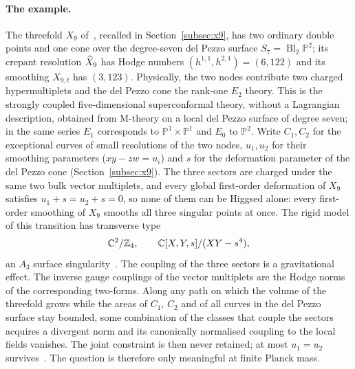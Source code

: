 \paragraph{The example.}
The threefold $X_9$ of~\cite{W26global,W26quantum}, recalled in Section~\ref{subsec:x9}, has
two ordinary double points and one cone over the degree-seven del Pezzo surface
$S_7=\operatorname{Bl}_2\mathbb P^2$; its crepant resolution $\widehat X_9$ has Hodge numbers
$(h^{1,1},h^{2,1})=(6,122)$ and its smoothing $X_{9,t}$ has $(3,123)$. Physically, the two nodes
contribute two charged hypermultiplets and the del Pezzo cone the rank-one $E_2$ theory. This is
the strongly coupled five-dimensional superconformal theory, without a Lagrangian description,
obtained from M-theory on a local del Pezzo surface of degree seven; in the same series $E_1$
corresponds to $\mathbb P^1\times\mathbb P^1$ and $E_0$ to $\mathbb P^2$. Write $C_1,C_2$ for the exceptional
curves of small resolutions of the two nodes, $u_1,u_2$ for their smoothing parameters
($xy-zw=u_i$) and $s$ for the deformation parameter of the del Pezzo cone
(Section~\ref{subsec:x9}). The three sectors are charged under the same two bulk vector multiplets,
and every global first-order deformation of $X_9$ satisfies $u_1+s=u_2+s=0$, so none of them can be Higgsed
alone: every first-order smoothing of $X_9$ smooths all three singular points at once. The rigid model of
this transition has transverse type
\begin{equation}
 \mathbb C^2/\mathbb Z_4,\qquad \mathbb C[X,Y,s]/(XY-s^4),
 \label{eq:intro-A3}
\end{equation}
an $A_3$ surface singularity~\cite[eq.~(3.10)]{W26quantum}. The coupling of the three sectors
is a gravitational effect. The inverse gauge couplings of the vector multiplets are the Hodge
norms of the corresponding two-forms. Along any path on which the volume of the threefold grows
while the areas of $C_1$, $C_2$ and of all curves in the del Pezzo surface stay bounded, some
combination of the classes that couple the sectors acquires a divergent norm and its canonically
normalised coupling to the local fields vanishes. The joint constraint is then never retained; at
most $u_1=u_2$ survives~\cite[Sect.~4, Thm.~4.3]{W26quantum}. The question is therefore only
meaningful at finite Planck mass.

